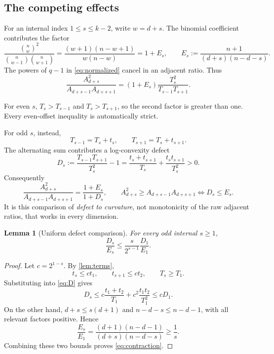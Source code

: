 \documentclass[11pt,letterpaper]{article}
\numberwithin{equation}{section}
\newtheorem{lemma}[theorem]{Lemma}
\theoremstyle{definition}
\begin{document}
\subsection{The competing effects}
For an internal index $1\le s\le k-2$, write $w=d+s$. The binomial
coefficient contributes the factor
\begin{equation}\label{eq:E}
 \frac{\binom nw^2}{\binom n{w-1}\binom n{w+1}}
 =\frac{(w+1)(n-w+1)}{w(n-w)}
 =1+E_s,\qquad
 E_s:=\frac{n+1}{(d+s)(n-d-s)}.
\end{equation}
The powers of $q-1$ in \eqref{eq:normalized} cancel in an adjacent
ratio. Thus
\begin{equation}\label{eq:ratio}
 \frac{A_{d+s}^2}{A_{d+s-1}A_{d+s+1}}
 =(1+E_s)\frac{T_s^2}{T_{s-1}T_{s+1}}.
\end{equation}

For even $s$, $T_s>T_{s-1}$ and $T_s>T_{s+1}$, so the second factor
is greater than one. Every even-offset inequality is automatically
strict.

For odd $s$, instead,
\[
 T_{s-1}=T_s+t_s,\qquad T_{s+1}=T_s+t_{s+1}.
\]
The alternating sum contributes a log-convexity defect
\begin{equation}\label{eq:D}
 D_s:=\frac{T_{s-1}T_{s+1}}{T_s^2}-1
 =\frac{t_s+t_{s+1}}{T_s}
  +\frac{t_st_{s+1}}{T_s^2}>0.
\end{equation}
Consequently
\begin{equation}\label{eq:ratio-odd}
 \frac{A_{d+s}^2}{A_{d+s-1}A_{d+s+1}}
 =\frac{1+E_s}{1+D_s},
 \qquad
 A_{d+s}^2\ge A_{d+s-1}A_{d+s+1}
 \Longleftrightarrow D_s\le E_s.
\end{equation}
It is this comparison of \emph{defect to curvature}, not monotonicity
of the raw adjacent ratios, that works in every dimension.

\begin{lemma}[Uniform defect comparison]\label{lem:defect}
For every odd internal $s\ge1$,
\begin{equation}\label{eq:contraction}
 \frac{D_s}{E_s}\le
 \frac{s}{2^{s-1}}\frac{D_1}{E_1}.
\end{equation}
\end{lemma}
\begin{proof}
Let $c=2^{1-s}$. By \cref{lem:terms},
\[
 t_s\le ct_1,\qquad t_{s+1}\le ct_2,\qquad T_s\ge T_1.
\]
Substituting into \eqref{eq:D} gives
\[
 D_s\le c\frac{t_1+t_2}{T_1}
       +c^2\frac{t_1t_2}{T_1^2}
 \le cD_1.
\]
On the other hand, $d+s\le s(d+1)$ and
$n-d-s\le n-d-1$, with all relevant factors positive. Hence
\[
 \frac{E_s}{E_1}
 =\frac{(d+1)(n-d-1)}{(d+s)(n-d-s)}\ge\frac1s.
\]
Combining these two bounds proves \eqref{eq:contraction}.
\end{proof}
\end{document}
